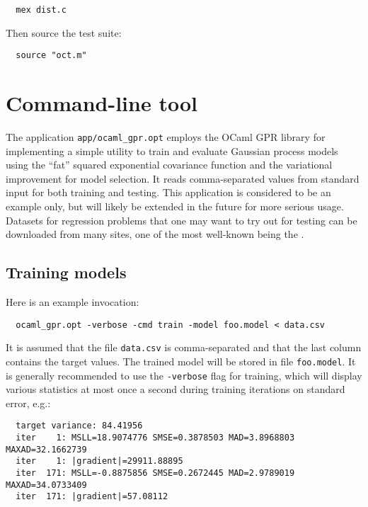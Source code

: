 \documentclass[10pt]{report}
\begin{document}
\begin{verbatim}
  mex dist.c
\end{verbatim}

\noindent Then source the test suite:

\begin{verbatim}
  source "oct.m"
\end{verbatim}

\section{Command-line tool}

The application \verb=app/ocaml_gpr.opt= employs the OCaml GPR library for
implementing a simple utility to train and evaluate Gaussian process models
using the ``fat'' squared exponential covariance function and the variational
improvement \cite{Titsias2009} for model selection.  It reads comma-separated
values from standard input for both training and testing.  This application is
considered to be an example only, but will likely be extended in the future for
more serious usage.\\

Datasets for regression problems that one may want to try out for testing can be
downloaded from many sites, one of the most well-known being the
.

\subsection{Training models}

Here is an example invocation:

\begin{verbatim}
  ocaml_gpr.opt -verbose -cmd train -model foo.model < data.csv
\end{verbatim}

It is assumed that the file \verb=data.csv= is comma-separated and that the last
column contains the target values.  The trained model will be stored in file
\verb=foo.model=.  It is generally recommended to use the \verb=-verbose= flag
for training, which will display various statistics at most once a second during
training iterations on standard error, e.g.:

{\footnotesize
\begin{verbatim}
  target variance: 84.41956
  iter    1: MSLL=18.9074776 SMSE=0.3878503 MAD=3.8968803 MAXAD=32.1662739
  iter    1: |gradient|=29911.88895
  iter  171: MSLL=-0.8875856 SMSE=0.2672445 MAD=2.9789019 MAXAD=34.0733409
  iter  171: |gradient|=57.08112
\end{verbatim}
}
\end{document}
